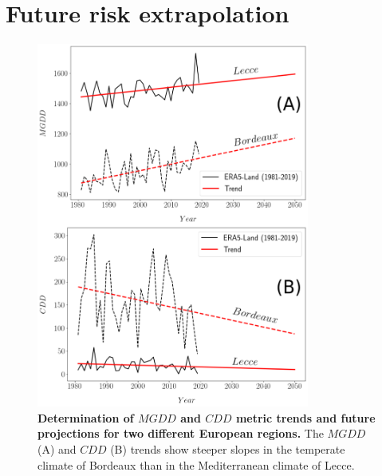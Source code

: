 \section{Future risk extrapolation}\label{app:future}

\begin{figure}[H]
    \centering
    \includegraphics[width=0.8\textwidth]{Figures/MGDD_CDD_trends.png}
    \caption[Determination of $MGDD$ and $CDD$ trends and
        future extrapolations]{\textbf{Determination of $MGDD$ and $CDD$ metric
            trends
            and
            future projections for two different European regions.} The $MGDD$
        (A) and
        $CDD$ (B) trends show steeper slopes in the temperate climate of
        Bordeaux than
        in the Mediterranean climate of Lecce.}
    \label{figS12} %
\end{figure}

